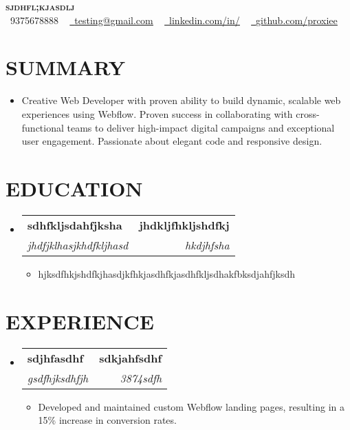 \documentclass[letterpaper,11pt]{article}
\makeatletter
\newcommand{\resumeItem}[1]{\item\small{{#1 \vspace{-3pt}}}}
\newcommand{\resumeSubheading}[4]{\vspace{-2pt}\item\begin{tabular*}{0.97\textwidth}[t]{l@{\extracolsep{\fill}}r}\textbf{#1} & #2 \\\textit{\small#3} & \textit{\small #4} \\\end{tabular*}\vspace{-7pt}}
\newcommand{\resumeSubHeadingListStart}{\begin{itemize}[leftmargin=0.15in, label={}]}
\newcommand{\resumeSubHeadingListEnd}{\end{itemize}}
\newcommand{\resumeItemListStart}{\begin{itemize}}
\newcommand{\resumeItemListEnd}{\end{itemize}\vspace{-5pt}}
\makeatother
\begin{document}
\begin{center}
    \textbf{\Huge \scshape {\fontsize{15pt}{20pt}\selectfont sjdhfl;kjasdlj}} \\ \vspace{1pt}
    \small \raisebox{-0.1\height}\faPhone\ 9375678888 ~ \href{mailto:testing@gmail.com}{\raisebox{-0.2\height}\faEnvelope\  \underline{testing@gmail.com}} ~ 
    \href{https://www.linkedin.com/feed/}{\raisebox{-0.2\height}\faLinkedin\ \underline{linkedin.com/in/}} ~ 
    \href{https://github.com/proxiee}{\raisebox{-0.2\height}\faGithub\ \underline{github.com/proxiee}}
    \vspace{-8pt}
\end{center}

\section{{\fontsize{9pt}{20pt}\selectfont \textbf{SUMMARY}}}\resumeSubHeadingListStart
\resumeItem{Creative Web Developer with proven ability to build dynamic, scalable web experiences using Webflow.  Proven success in collaborating with cross-functional teams to deliver high-impact digital campaigns and exceptional user engagement.  Passionate about elegant code and responsive design.}
\resumeSubHeadingListEnd\vspace{-18pt}
\section{{\fontsize{9pt}{20pt}\selectfont \textbf{EDUCATION}}}\resumeSubHeadingListStart
\resumeSubheading{sdhfkljsdahfjksha}{\textbf{jhdkljfhkljshdfkj}}{jhdfjklhasjkhdfkljhasd}{hkdjhfsha}
\resumeItemListStart
\resumeItem{hjksdfhkjshdfkjhasdjkfhkjasdhfkjasdhfkljsdhakfbksdjahfjksdh}
\resumeItemListEnd
\resumeSubHeadingListEnd\vspace{-18pt}
\section{{\fontsize{9pt}{20pt}\selectfont \textbf{EXPERIENCE}}}\resumeSubHeadingListStart
\resumeSubheading{sdjhfasdhf}{\textbf{sdkjahfsdhf}}{gsdfhjksdhfjh}{3874sdfh}
\resumeItemListStart
\resumeItem{Developed and maintained custom Webflow landing pages, resulting in a 15\% increase in conversion rates.}
\resumeItemListEnd
\resumeSubHeadingListEnd\vspace{-17pt}
\end{document}
